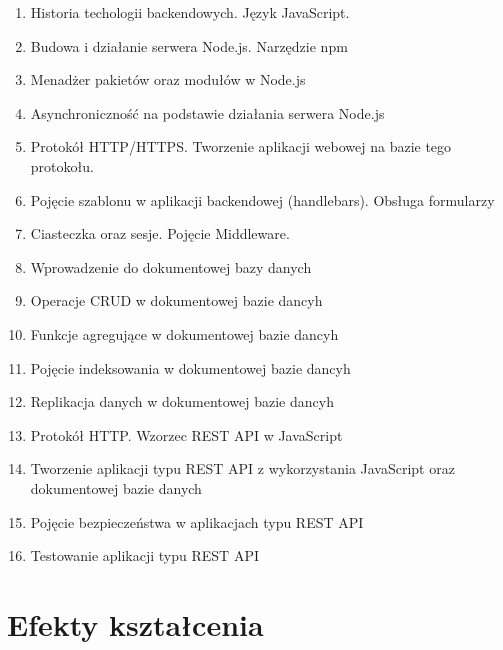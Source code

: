 \documentclass[12pt, a4paper]{article}
\begin{document}
\begin{enumerate}
  \item Historia techologii backendowych. Język JavaScript.
  \item Budowa i działanie serwera Node.js. Narzędzie npm
  \item Menadżer pakietów oraz modułów w Node.js
  \item Asynchroniczność na podstawie działania serwera Node.js
  \item Protokół HTTP/HTTPS. Tworzenie aplikacji webowej na bazie tego protokołu.
  \item Pojęcie szablonu w aplikacji backendowej (handlebars). Obsługa formularzy
  \item Ciasteczka oraz sesje. Pojęcie Middleware.
  \item Wprowadzenie do dokumentowej bazy danych
  \item Operacje CRUD w dokumentowej bazie dancyh
  \item Funkcje agregujące w dokumentowej bazie dancyh
  \item Pojęcie indeksowania w dokumentowej bazie dancyh
  \item Replikacja danych w dokumentowej bazie dancyh
  \item Protokół HTTP. Wzorzec REST API w JavaScript
  \item Tworzenie aplikacji typu REST API z wykorzystania JavaScript oraz dokumentowej bazie danych
  \item Pojęcie bezpieczeństwa w aplikacjach typu REST API
  \item Testowanie aplikacji typu REST API
\end{enumerate}

\section{Efekty kształcenia}
\end{document}
